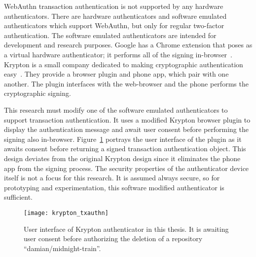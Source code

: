 

WebAuthn transaction authentication is not supported by any hardware authenticators. There are hardware authenticators and software emulated authenticators which support WebAuthn, but only for regular two-factor authentication. The software emulated authenticators are intended for development and research purposes. Google has a Chrome extension that poses as a virtual hardware authenticator; it performs all of the signing in-browser~\cite{virtual-authenticators-tab}. Krypton is a small company dedicated to making cryptographic authentication easy~\cite{krypton}. They provide a browser plugin and phone app, which pair with one another. The plugin interfaces with the web-browser and the phone performs the cryptographic signing. 

This research must modify one of the software emulated authenticators to support transaction authentication. It uses a modified Krypton browser plugin to display the authentication message and await user consent before performing the signing also in-browser. Figure~\ref{Fig:KryptonAuthenticator} portrays the user interface of the plugin as it awaits consent before returning a signed transaction authentication object. This design deviates from the original Krypton design since it eliminates the phone app from the signing process. The security properties of the authenticator device itself is not a focus for this research. It is assumed always secure, so for prototyping and experimentation, this software modified authenticator is sufficient.

\begin{figure}[h]
  \centering
  \texttt{[image: krypton\_txauthn]}
  \caption{User interface of Krypton authenticator in this thesis. It is awaiting user consent before authorizing the deletion of a repository ``damian/midnight-train''.}
  \label{Fig:KryptonAuthenticator}
\end{figure}


